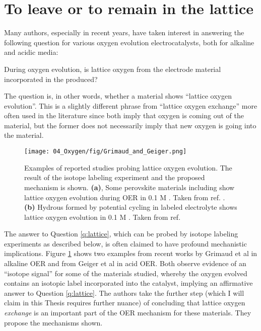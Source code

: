 

\section{To leave or to remain in the lattice}\label{sec:lattice_O}

Many authors, especially in recent years, have taken interest in answering the following question for various oxygen evolution electrocatalysts, both for alkaline and acidic media:
\begin{question}
During oxygen evolution, is lattice oxygen from the electrode material incorporated in the  produced? \label{q:lattice}
\end{question}
The question is, in other words, whether a material shows ``lattice oxygen evolution''. This is a slightly different phrase from ``lattice oxygen exchange'' more often used in the literature since both imply that oxygen is coming out of the material, but the former does not necessarily imply that new oxygen is going into the material.

\begin{figure}[h!]
	\centering
	\texttt{[image: 04\_Oxygen/fig/Grimaud\_and\_Geiger.png]}
	\caption{Examples of reported studies probing lattice oxygen evolution. The result of the isotope labeling experiment and the proposed mechanism is shown. \textbf{(a)}, Some perovskite materials including  show lattice oxygen evolution during OER in 0.1 M . Taken from ref. . \textbf{(b)} Hydrous  formed by potential cycling  in labeled electrolyte shows lattice oxygen evolution in 0.1 M . Taken from ref. }
	\label{fig:GG}
\end{figure}

The answer to Question \ref{q:lattice}, which can be probed by isotope labeling experiments as described below, is often claimed to have profound mechanistic implications. Figure \ref{fig:GG} shows two examples from recent works by Grimaud et al\cite{Grimaud2017} in alkaline OER and from Geiger et al\cite{Geiger2018} in acid OER. Both observe evidence of an ``isotope signal'' for some of the materials studied, whereby the oxygen evolved contains an isotopic label incorporated into the catalyst, implying an affirmative answer to Question \ref{q:lattice}. The authors take the further step (which I will claim in this Thesis requires further nuance) of concluding that lattice oxygen \textit{exchange} is an important part of the OER mechanism for these materials. They propose the mechanisms shown.

